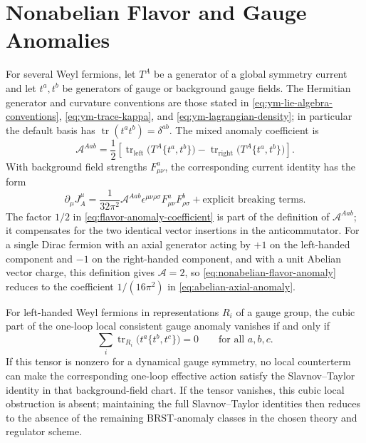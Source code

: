 \section{Nonabelian Flavor and Gauge Anomalies}

\begin{definition}
\label{def:trace-anomaly-coefficient}
For several Weyl fermions, let \(T^A\) be a generator of a global symmetry
current and let \(t^a,t^b\) be generators of gauge or background gauge fields.
The Hermitian generator and curvature conventions are those stated in
\eqref{eq:ym-lie-algebra-conventions}, \eqref{eq:ym-trace-kappa}, and
\eqref{eq:ym-lagrangian-density}; in particular the default basis has
\(\operatorname{tr}(t^a t^b)=\delta^{ab}\).  The mixed anomaly coefficient is
\begin{equation}
  \mathcal A^{Aab}
  =
  \frac12
  \left[
  \operatorname{tr}_{\mathrm{left}}
  \bigl(T^A\{t^a,t^b\}\bigr)
  -
  \operatorname{tr}_{\mathrm{right}}
  \bigl(T^A\{t^a,t^b\}\bigr)
  \right].
  \label{eq:flavor-anomaly-coefficient}
\end{equation}
With background field strengths \(F^a_{\mu\nu}\), the corresponding current
identity has the form
\begin{equation}
  \partial_\mu J_A^\mu
  =
  \frac1{32\pi^2}
  \mathcal A^{Aab}
  \epsilon^{\mu\nu\rho\sigma}
  F^a_{\mu\nu}F^b_{\rho\sigma}
  +
  \text{explicit breaking terms}.
  \label{eq:nonabelian-flavor-anomaly}
\end{equation}
The factor \(1/2\) in \eqref{eq:flavor-anomaly-coefficient} is part of the
definition of \(\mathcal A^{Aab}\); it compensates for the two identical vector
insertions in the anticommutator.  For a single Dirac fermion with an axial
generator acting by \(+1\) on the left-handed component and \(-1\) on the
right-handed component, and with a unit Abelian vector charge, this definition
gives \(\mathcal A=2\), so \eqref{eq:nonabelian-flavor-anomaly} reduces to the
coefficient \(1/(16\pi^2)\) in \eqref{eq:abelian-axial-anomaly}.
\end{definition}

\begin{proposition}
\label{prop:cubic-gauge-anomaly-obstruction}
For left-handed Weyl fermions in representations \(R_i\) of a gauge group,
the cubic part of the one-loop local consistent gauge anomaly vanishes if and
only if
\begin{equation}
  \sum_i
  \operatorname{tr}_{R_i}
  \bigl(t^a\{t^b,t^c\}\bigr)
  =
  0
  \qquad
  \text{for all }a,b,c.
  \label{eq:gauge-anomaly-cancellation}
\end{equation}
If this tensor is nonzero for a dynamical gauge symmetry, no local
counterterm can make the corresponding one-loop effective action satisfy the
Slavnov--Taylor identity in that background-field chart.  If the tensor
vanishes, this cubic local obstruction is absent; maintaining the full
Slavnov--Taylor identities then reduces to the absence of the remaining
BRST-anomaly classes in the chosen theory and regulator scheme.
\end{proposition}

